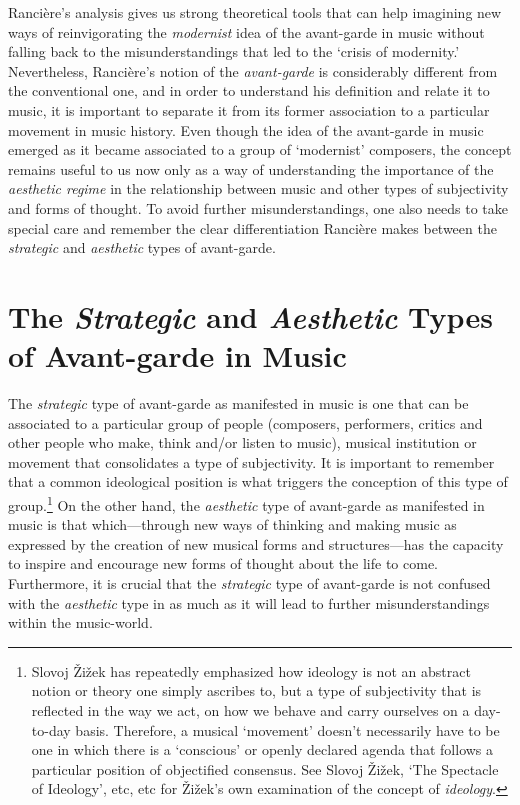 Ranci\`{e}re's analysis gives us strong theoretical tools that can help imagining new ways of reinvigorating the \emph{modernist} idea of the avant-garde in music without falling back to the misunderstandings that led to the `crisis of modernity.' Nevertheless, Ranci\`{e}re's notion of the \emph{avant-garde} is considerably different from the conventional one, and in order to understand his definition and relate it to music, it is important to separate it from its former association to a particular movement in music history. Even though the idea of the avant-garde in music emerged as it became associated to a group of `modernist' composers, the concept remains useful to us now only as a way of understanding the importance of the \emph{aesthetic regime} in the relationship between music and other types of subjectivity and forms of thought. To avoid further misunderstandings, one also needs to take special care and remember the clear differentiation Ranci\`{e}re makes between the \emph{strategic} and \emph{aesthetic} types of avant-garde.

\section{The \emph{Strategic} and \emph{Aesthetic} Types of Avant-garde in Music}

The \emph{strategic} type of avant-garde as manifested in music is one that can be associated to a particular group of people (composers, performers, critics and other people who make, think and/or listen to music), musical institution or movement that consolidates a type of subjectivity. It is important to remember that a common ideological position is what triggers the conception of this type of group.\footnote{Slovoj \v{Z}i\v{z}ek has repeatedly emphasized how ideology is not an abstract notion or theory one simply ascribes to, but a type of subjectivity that is reflected in the way we act, on how we behave and carry ourselves on a day-to-day basis. Therefore, a musical `movement' doesn't necessarily have to be one in which there is a `conscious' or openly declared agenda that follows a particular position of objectified consensus. See Slovoj \v{Z}i\v{z}ek, `The Spectacle of Ideology', etc, etc for \v{Z}i\v{z}ek's own examination of the concept of \emph{ideology}.} On the other hand,  the \emph{aesthetic} type of avant-garde as manifested in music is that which---through new ways of thinking and making music as expressed by the creation of new musical forms and structures---has the capacity to inspire and encourage new forms of thought about the life to come.  Furthermore, it is crucial that the \emph{strategic} type of avant-garde is not confused with the \emph{aesthetic} type in as much as it will lead to further misunderstandings within the music-world. 

